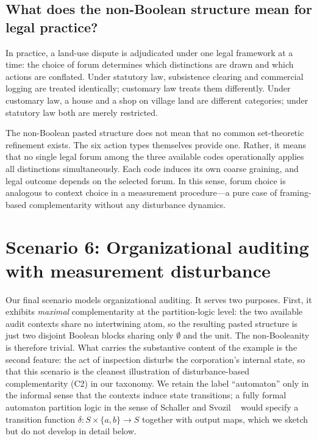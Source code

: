 \documentclass{article}
\begin{document}
\subsection{What does the non-Boolean structure mean for legal practice?}

In practice, a land-use dispute is adjudicated under one legal
framework at a time: the choice of forum determines which distinctions
are drawn and which actions are conflated. Under statutory law,
subsistence clearing and commercial logging are treated identically;
customary law treats them differently. Under customary law, a house
and a shop on village land are different categories; under statutory
law both are merely restricted.

The non-Boolean pasted structure does not mean that no common
set-theoretic refinement exists. The six action types themselves
provide one. Rather, it means that no single legal forum among the
three available codes operationally applies all distinctions
simultaneously. Each code induces its own coarse graining, and legal
outcome depends on the selected forum. In this sense, forum choice is
analogous to context choice in a measurement procedure---a pure case
of framing-based complementarity without any disturbance dynamics.

\section{Scenario 6: Organizational auditing with measurement
disturbance}
\label{sec:org}

Our final scenario models organizational auditing. It serves two
purposes. First, it exhibits \emph{maximal} complementarity at the
partition-logic level: the two available audit contexts share no
intertwining atom, so the resulting pasted structure is just two
disjoint Boolean blocks sharing only $\emptyset$ and the unit. The
non-Booleanity is therefore trivial. What carries the substantive
content of the example is the second feature: the act of inspection
disturbs the corporation's internal state, so that this scenario is
the cleanest illustration of disturbance-based complementarity (C2)
in our taxonomy. We retain the label ``automaton'' only in the
informal sense that the contexts induce state transitions; a fully
formal automaton partition logic in the sense of Schaller and Svozil
~\cite{schaller-92,svozil-2001-eua} would specify a transition
function $\delta\colon S\times\{a,b\}\to S$ together with output
maps, which we sketch but do not develop in detail below.
\end{document}

